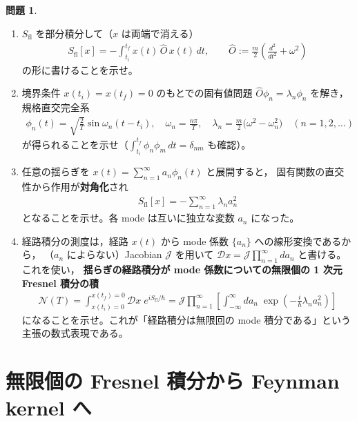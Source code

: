 \documentclass[dvipdfmx, uplatex]{jsarticle}
\theoremstyle{definition}
\newtheorem{prob}{問題}
\begin{document}
\begin{prob}\label{prob:mode}
\begin{enumerate}
\item $S_{\text{fl}}$ を部分積分して（$x$ は両端で消える）
\begin{align}
    S_{\text{fl}}[x]
    =-\int_{t_i}^{t_f}\! x(t)\,\hat O\,x(t)\,dt,
    \qquad
    \hat O:=\frac{m}{2}\left(\frac{d^2}{dt^2}+\omega^2\right)
\label{eq:OP}
\end{align}
の形に書けることを示せ。
\item 境界条件 $x(t_i)=x(t_f)=0$ のもとでの固有値問題 $\hat O\phi_n=\lambda_n\phi_n$ を解き，
規格直交完全系
\begin{align}
    \phi_n(t)=\sqrt{\frac{2}{T}}\sin\omega_n(t-t_i),
    \quad
    \omega_n=\frac{n\pi}{T},
    \quad
    \lambda_n=\frac{m}{2}\big(\omega^2-\omega_n^2\big)
    \quad(n=1,2,\dots)
\label{eq:modes}
\end{align}
が得られることを示せ（$\int_{t_i}^{t_f}\phi_n\phi_m\,dt=\delta_{nm}$ も確認）。
\item 任意の揺らぎを $x(t)=\sum_{n=1}^{\infty}a_n\phi_n(t)$ と展開すると，
固有関数の直交性から作用が\textbf{対角化}され
\begin{align}
    S_{\text{fl}}[x]=-\sum_{n=1}^{\infty}\lambda_n a_n^2
\label{eq:Sdiag}
\end{align}
となることを示せ。各 mode は互いに独立な変数 $a_n$ になった。
\item 経路積分の測度は，経路 $x(t)$ から mode 係数 $\{a_n\}$ への線形変換であるから，
（$a_n$ によらない）Jacobian $\mathcal{J}$ を用いて
$\mathcal{D}x=\mathcal{J}\prod_{n=1}^{\infty}da_n$ と書ける。これを使い，
\textbf{揺らぎの経路積分が mode 係数についての無限個の 1 次元 Fresnel 積分の積}
\begin{align}
    \mathcal{N}(T)
    =\int_{x(t_i)=0}^{x(t_f)=0}\!\mathcal{D}x\;e^{iS_{\text{fl}}/\hbar}
    =\mathcal{J}\prod_{n=1}^{\infty}\left[\int_{-\infty}^{\infty}\! da_n\;
    \exp\!\left(-\frac{i}{\hbar}\lambda_n a_n^2\right)\right]
\label{eq:Nmode}
\end{align}
になることを示せ。これが「経路積分は無限回の mode 積分である」という主張の数式表現である。
\end{enumerate}
\end{prob}

\section{無限個の Fresnel 積分から Feynman kernel へ}
\end{document}
